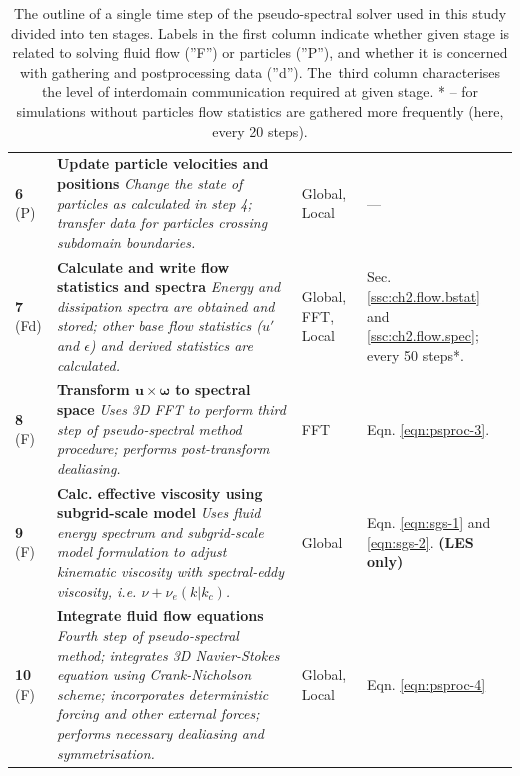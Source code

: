 \documentclass{pracamgren}
\begin{document}
\begin{table}[!htbp]
\begin{tabular}{p{10mm}p{75mm}p{25mm}p{27mm}}
\rowcolor[RGB]{240,220,190} \textbf{6} \newline (P) &
\textbf{Update particle velocities and positions} \newline \emph{Change the state of particles as calculated in step 4; transfer data for particles crossing subdomain boundaries.} & Global, Local & --- \\ 
\rowcolor[RGB]{150,240,150} \textbf{7} \newline (Fd) &
\textbf{Calculate and write flow statistics and spectra} \newline \emph{Energy and dissipation spectra are obtained and stored; other base flow statistics ($u'$ and $\epsilon$) and derived statistics are calculated.} & Global, FFT, Local & Sec. \ref{ssc:ch2.flow.bstat} and \ref{ssc:ch2.flow.spec}; \newline every 50 steps*. \\ 
\rowcolor[RGB]{190,240,220} \textbf{8} \newline (F) & 
\textbf{Transform $\mathbf{u} \times \boldsymbol{\omega}$ to spectral space} \newline \emph{Uses 3D FFT to perform third step of pseudo-spectral method procedure; performs post-transform dealiasing.} & FFT & Eqn. \ref{eqn:psproc-3}. \\
\rowcolor[RGB]{150,190,240} \textbf{9} \newline (F) & 
\textbf{Calc. effective viscosity using subgrid-scale model} \newline \emph{Uses fluid energy spectrum and subgrid-scale model formulation to adjust kinematic viscosity with spectral-eddy viscosity, i.e. $\nu + \nu_e(k|k_c)$.} & Global & Eqn. \ref{eqn:sgs-1} and \ref{eqn:sgs-2}. \newline \textbf{(LES only)} \\ 
\rowcolor[RGB]{190,240,220} \textbf{10} \newline (F) &
\textbf{Integrate fluid flow equations} \newline \emph{Fourth step of pseudo-spectral method; integrates 3D Navier-Stokes equation using Crank-Nicholson scheme; incorporates deterministic forcing and other external forces; performs necessary dealiasing and symmetrisation.} & Global, Local & Eqn. \ref{eqn:psproc-4} \\ \hline \hline
\end{tabular}
\caption{
The outline of a single time step of the pseudo-spectral solver used in this study divided into ten stages.
Labels in the first column indicate whether given stage is related to solving fluid flow (''F'') or particles (''P''), and whether it is concerned with gathering and postprocessing data (''d'').
The~third column characterises the level of interdomain communication required at given stage. \newline
* -- for simulations without particles flow statistics are gathered more frequently (here, every 20 steps).
}
\label{tab:code-steps}
\end{table}
\end{document}
